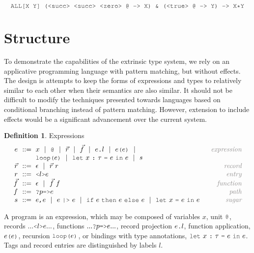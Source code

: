 \documentclass[acmsmall]{acmart}
\theoremstyle{definition}
\newtheorem{definition}{Definition}[section]
\begin{document}
\[
  \J{ALL[X Y] (<succ> <succ> <zero> @ -> X) \& (<true> @ -> Y) -> X*Y}
\]


\section{Structure}
\label{sec:structure}
To demonstrate the capabilities of the extrinsic type system, we rely on an applicative
programming language with pattern matching, but without effects.
The design is attempts to keep the forms of expressions and types to relatively 
similar to each other when their semantics are also similar. 
It should not be difficult to modify the techniques presented towards
languages based on conditional branching instead of pattern matching. However,
extension to include effects would be a significant advancement over the current
system.

\begin{definition} Expressions
  \label{def:expressions}
  \[\begin{array}[t]{r@{}l@{}r}
    \nonterm{e} 
    & 
    \is 
    \begin{array}[t]{@{}l}
      x \sep 
      \J{@} \sep
      \vec{r} \sep
      \vec{f} \sep 
      e\J{.}l \sep
      e\J{(}e\J{)} \sep
      \\
      \J{loop(}e\J{)} \sep
      \J{let}\ x\ \J{:}\ \tau\ \J{=}\ e\ \J{in}\ e \sep
      s
    \end{array}
    & \com{expression}
    \\
    \nonterm{\vec{r}} & \is \epsilon \sep \vec{r}\ r 
    & \com{record}
    \\
    \nonterm{r} & \is \J{<}l\J{>}e
    & \com{entry}
    \\
    \nonterm{\vec{f}} & \is \epsilon \sep \vec{f}\ f
    & \com{function}
    \\
    \nonterm{f} & \is \J{?}p\J{=>}e
    & \com{path}
    \\
    \nonterm{s} 
    & 
    \is 
    \begin{array}[t]{@{}l}
      e \J{,} e \sep
      e\ \J{|>}\ e \sep
      \J{if}\ e\ \J{then}\ e\ \J{else}\ e \sep
      \J{let}\ x\ \J{=}\ e\ \J{in}\ e
    \end{array}
    & \com{sugar}
  \end{array}\]
\end{definition}
A program is an expression, which may be composed of variables $x$, unit $\J{@}$,
records $... \J{<}l\J{>} e ...$, functions $...\J{?}p \J{=>} e ...$, record
projection $e\J{.}l$, function application, $e\J{(}e\J{)}$, recursion $\J{loop(}e\J{)}$,
or bindings with type annotations, $\J{let}\ x\ \J{:}\ \tau\ \J{=}\ e\ \J{in}\ e$.
Tags and record entries are distinguished by labels $l$.
\end{document}
